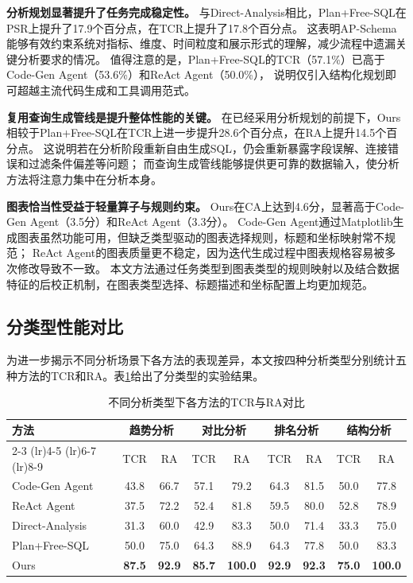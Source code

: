 \textbf{分析规划显著提升了任务完成稳定性。}
与Direct-Analysis相比，Plan+Free-SQL在PSR上提升了17.9个百分点，在TCR上提升了17.8个百分点。
这表明AP-Schema能够有效约束系统对指标、维度、时间粒度和展示形式的理解，减少流程中遗漏关键分析要求的情况。
值得注意的是，Plan+Free-SQL的TCR（57.1\%）已高于Code-Gen Agent（53.6\%）和ReAct Agent（50.0\%），
说明仅引入结构化规划即可超越主流代码生成和工具调用范式。

\textbf{复用查询生成管线是提升整体性能的关键。}
在已经采用分析规划的前提下，Ours相较于Plan+Free-SQL在TCR上进一步提升28.6个百分点，在RA上提升14.5个百分点。
这说明若在分析阶段重新自由生成SQL，仍会重新暴露字段误解、连接错误和过滤条件偏差等问题；
而查询生成管线能够提供更可靠的数据输入，使分析方法将注意力集中在分析本身。

\textbf{图表恰当性受益于轻量算子与规则约束。}
Ours在CA上达到4.6分，显著高于Code-Gen Agent（3.5分）和ReAct Agent（3.3分）。
Code-Gen Agent通过Matplotlib生成图表虽然功能可用，但缺乏类型驱动的图表选择规则，标题和坐标映射常不规范；
ReAct Agent的图表质量更不稳定，因为迭代生成过程中图表规格容易被多次修改导致不一致。
本文方法通过任务类型到图表类型的规则映射以及结合数据特征的后校正机制，在图表类型选择、标题描述和坐标配置上均更加规范。

\subsection{分类型性能对比}

为进一步揭示不同分析场景下各方法的表现差异，本文按四种分析类型分别统计五种方法的TCR和RA。表\ref{tab:chap04_per_type}给出了分类型的实验结果。

\begin{table}[htbp]
	\setlength{\abovecaptionskip}{5pt}
	\setlength{\belowcaptionskip}{5pt}
	\caption{不同分析类型下各方法的TCR与RA对比}\label{tab:chap04_per_type}
	\centering
	\footnotesize
	\begin{tabular}{lcccccccc}
		\toprule
		\multirow{2}{*}{方法} & \multicolumn{2}{c}{趋势分析} & \multicolumn{2}{c}{对比分析} & \multicolumn{2}{c}{排名分析} & \multicolumn{2}{c}{结构分析} \\
		\cmidrule(lr){2-3} \cmidrule(lr){4-5} \cmidrule(lr){6-7} \cmidrule(lr){8-9}
		& TCR & RA & TCR & RA & TCR & RA & TCR & RA \\
		\midrule
		Code-Gen Agent & 43.8 & 66.7 & 57.1 & 79.2 & 64.3 & 81.5 & 50.0 & 77.8 \\
		ReAct Agent & 37.5 & 72.2 & 52.4 & 81.8 & 59.5 & 80.0 & 52.8 & 78.9 \\
		\midrule
		Direct-Analysis & 31.3 & 60.0 & 42.9 & 83.3 & 50.0 & 71.4 & 33.3 & 75.0 \\
		Plan+Free-SQL & 50.0 & 75.0 & 64.3 & 88.9 & 64.3 & 77.8 & 50.0 & 83.3 \\
		Ours & \textbf{87.5} & \textbf{92.9} & \textbf{85.7} & \textbf{100.0} & \textbf{92.9} & \textbf{92.3} & \textbf{75.0} & \textbf{100.0} \\
		\bottomrule
	\end{tabular}
\end{table}

